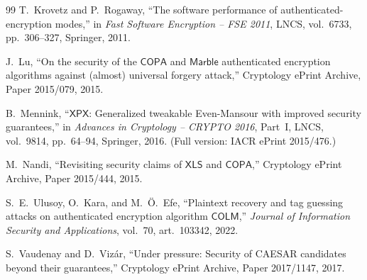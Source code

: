 \documentclass[11pt,a4paper]{article}
\theoremstyle{definition}
\theoremstyle{remark}
\newcommand{\COLM}{\mathsf{COLM}}
\newcommand{\COPA}{\mathsf{COPA}}
\begin{document}
\begin{thebibliography}{99}
T.~Krovetz and P.~Rogaway,
``The software performance of authenticated-encryption modes,'' in \emph{Fast Software Encryption -- FSE 2011}, LNCS, vol.~6733, pp.~306--327, Springer, 2011.

J.~Lu,
``On the security of the $\COPA$ and $\mathsf{Marble}$ authenticated encryption algorithms against (almost) universal forgery attack,'' Cryptology ePrint Archive, Paper 2015/079, 2015.

B.~Mennink,
``$\mathsf{XPX}$: Generalized tweakable Even-Mansour with improved security guarantees,'' in \emph{Advances in Cryptology -- CRYPTO 2016}, Part~I, LNCS, vol.~9814, pp.~64--94, Springer, 2016. (Full version: IACR ePrint 2015/476.)

M.~Nandi,
``Revisiting security claims of $\mathsf{XLS}$ and $\COPA$,'' Cryptology ePrint Archive, Paper 2015/444, 2015.

S.~E.~Ulusoy, O.~Kara, and M.~{\"O}.~Efe,
``Plaintext recovery and tag guessing attacks on authenticated encryption algorithm $\COLM$,'' \emph{Journal of Information Security and Applications}, vol.~70, art.~103342, 2022.

S.~Vaudenay and D.~Viz\'{a}r,
``Under pressure: Security of CAESAR candidates beyond their guarantees,'' Cryptology ePrint Archive, Paper 2017/1147, 2017.

\end{thebibliography}
\end{document}
